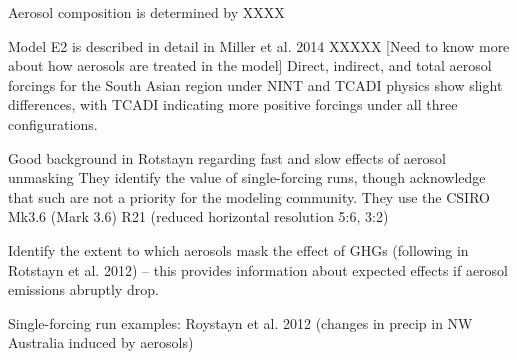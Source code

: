 \documentclass[11pt,reqno]{amsart}
\begin{document}
\begin{itemize}
Aerosol composition is determined by XXXX 



Model E2 is described in detail in Miller et al. 2014 XXXXX   [Need to know more about how aerosols are treated in the model]    Direct, indirect, and total aerosol forcings for the South Asian region under NINT and TCADI physics show slight differences, with TCADI indicating more positive forcings under all three configurations.  


Good background in Rotstayn regarding fast and slow effects of aerosol unmasking 
They identify the value of single-forcing runs, though acknowledge that such are not a priority for the modeling community.  They use the CSIRO Mk3.6 (Mark 3.6) R21 (reduced horizontal resolution 5:6, 3:2) 

Identify the extent to which aerosols mask the effect of GHGs (following in Rotstayn et al. 2012) -- this provides information about expected effects if aerosol emissions abruptly drop.  



Single-forcing run examples: Roystayn et al. 2012 (changes in precip in NW Australia induced by aerosols) 

\end{itemize}

%
%
\end{document}
